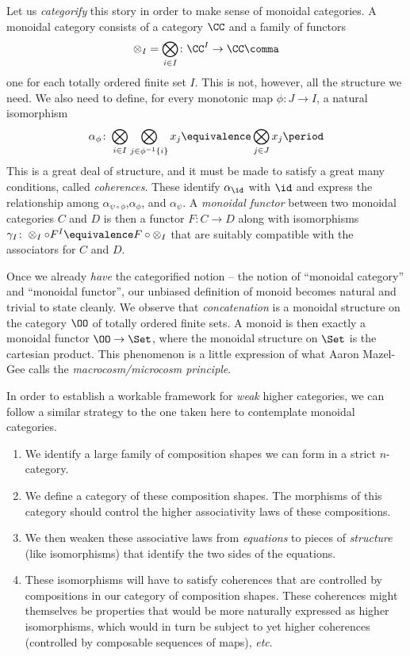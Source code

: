 Let us \emph{categorify} this story in order to make sense of monoidal categories.
A monoidal category consists of a category $\CC$ and a family of functors
\[
  \otimes_I = \bigotimes_{i \in I} \colon \CC^I \to \CC \comma
\]
one for each totally ordered finite set $I$.
This is not, however, all the structure we need.
We also need to define, for every monotonic map $\phi \colon J \to I$, a natural isomorphism
\[
  \alpha_{\phi} \colon \bigotimes_{i \in I} \bigotimes_{j \in \phi^{-1}\{i\}} x_j \equivalence \bigotimes_{j \in J} x_j \period
\]
This is a great deal of structure, and
it must be made to satisfy a great many conditions, called \emph{coherences}.
These identify $\alpha_{\id}$ with $\id$ and express the relationship among $\alpha_{\psi \circ \phi}$,$\alpha_{\phi}$, and $\alpha_{\psi}$.
A \emph{monoidal functor} between two monoidal categories $C$ and $D$ is then a functor $F \colon C \to D$ along with isomorphisms $\gamma_I \colon \otimes_I \circ F^I \equivalence F \circ \otimes_I$ that are suitably compatible with the associators for $C$ and $D$.

Once we already \emph{have} the categorified notion -- the notion of \enquote{monoidal category} and \enquote{monoidal functor}, our unbiased definition of monoid becomes natural and trivial to state cleanly.
We observe that \emph{concatenation} is a monoidal structure on the category $\OO$ of totally ordered finite sets.
A monoid is then exactly a monoidal functor $\OO \to \Set$, where the monoidal structure on $\Set$ is the cartesian product.
This phenomenon is a little expression of what Aaron Mazel-Gee calls the \emph{macrocosm/microcosm principle}.

In order to establish a workable framework for \emph{weak} higher categories, we can follow a similar strategy to the one taken here to contemplate monoidal categories.
\begin{enumerate}
  \item We identify a large family of composition shapes we can form in a strict $n$-category.
  \item We define a category of these composition shapes.
    The morphisms of this category should control the higher associativity laws of these compositions.
  \item We then weaken these associative laws from \emph{equations} to pieces of \emph{structure} (like isomorphisms) that identify the two sides of the equations.
  \item These isomorphisms will have to satisfy coherences that are controlled by compositions in our category of composition shapes.
    These coherences might themselves be properties that would be more naturally expressed as higher isomorphisms,
    which would in turn be subject to yet higher coherences (controlled by composable sequences of maps), 
    \emph{etc}.
\end{enumerate}

